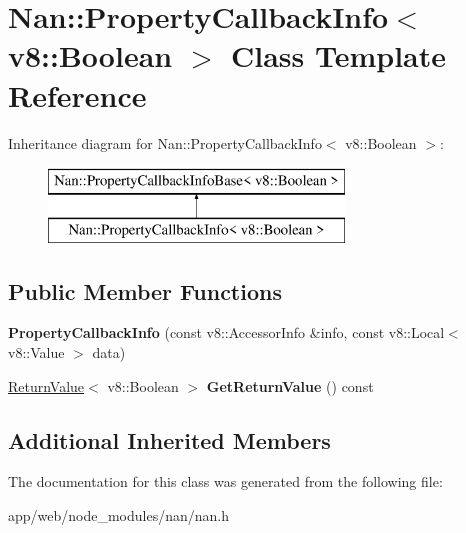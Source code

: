 \hypertarget{class_nan_1_1_property_callback_info_3_01v8_1_1_boolean_01_4}{}\section{Nan\+:\+:Property\+Callback\+Info$<$ v8\+:\+:Boolean $>$ Class Template Reference}
\label{class_nan_1_1_property_callback_info_3_01v8_1_1_boolean_01_4}
Inheritance diagram for Nan\+:\+:Property\+Callback\+Info$<$ v8\+:\+:Boolean $>$\+:\begin{figure}[H]
\begin{center}
\leavevmode
\includegraphics[height=2.000000cm]{class_nan_1_1_property_callback_info_3_01v8_1_1_boolean_01_4}
\end{center}
\end{figure}
\subsection*{Public Member Functions}
\begin{DoxyCompactItemize}
\item 
\mbox{\label{class_nan_1_1_property_callback_info_3_01v8_1_1_boolean_01_4_abb99ff8b5c2f96a69c820fd6e06c0cd7}} 
{\bfseries Property\+Callback\+Info} (const v8\+::\+Accessor\+Info \&info, const v8\+::\+Local$<$ v8\+::\+Value $>$ data)
\item 
\mbox{\label{class_nan_1_1_property_callback_info_3_01v8_1_1_boolean_01_4_a55f3bba4df6ef42e530e9f719fb667ea}} 
\hyperlink{class_nan_1_1_return_value}{Return\+Value}$<$ v8\+::\+Boolean $>$ {\bfseries Get\+Return\+Value} () const
\end{DoxyCompactItemize}
\subsection*{Additional Inherited Members}


The documentation for this class was generated from the following file\+:\begin{DoxyCompactItemize}
\item 
app/web/node\+\_\+modules/nan/nan.\+h\end{DoxyCompactItemize}
